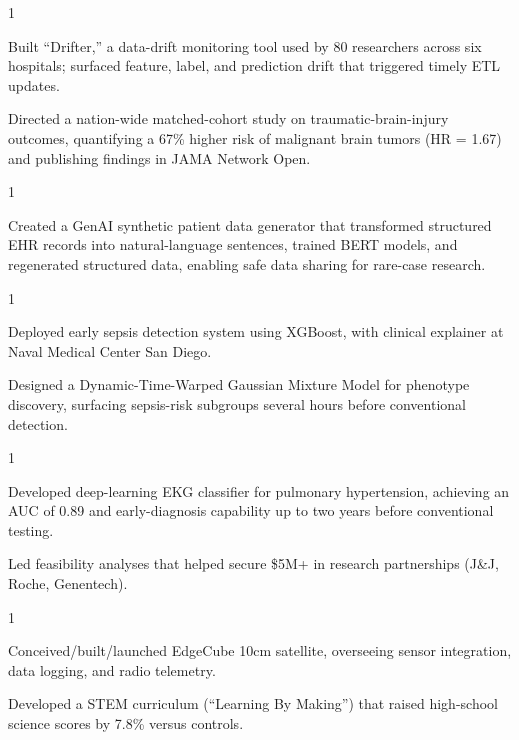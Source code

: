 \documentclass[letterpaper, 11pt]{resume}
\begin{document}
\begin{entryList}{1}
	\item Built ``Drifter,'' a data-drift monitoring tool used by 80 researchers across six hospitals; surfaced feature, label, and prediction drift that triggered timely ETL updates.
	\item Directed a nation-wide matched-cohort study on traumatic-brain-injury outcomes, quantifying a 67\% higher risk of malignant brain tumors (HR = 1.67) and publishing findings in JAMA Network Open.
\end{entryList}

\begin{entryList}{1}
	\item Created a GenAI synthetic patient data generator that transformed structured EHR records into natural-language sentences, trained BERT models, and regenerated structured data, enabling safe data sharing for rare-case research.
\end{entryList}

\begin{entryList}{1}
    \item Deployed early sepsis detection system using XGBoost, with clinical explainer at Naval Medical Center San Diego.
    \item Designed a Dynamic-Time-Warped Gaussian Mixture Model for phenotype discovery, surfacing sepsis-risk subgroups several hours before conventional detection.
\end{entryList}

\begin{entryList}{1}
	\item Developed deep-learning EKG classifier for pulmonary hypertension, achieving an AUC of 0.89 and early-diagnosis capability up to two years before conventional testing.
	\item Led feasibility analyses that helped secure \$5M+ in research partnerships (J\&J, Roche, Genentech).
\end{entryList}

\begin{entryList}{1}
	\item Conceived/built/launched EdgeCube 10cm satellite, overseeing sensor integration, data logging, and radio telemetry.
	\item Developed a STEM curriculum (``Learning By Making'') that raised high-school science scores by 7.8\% versus controls.
\end{entryList}
\end{document}
